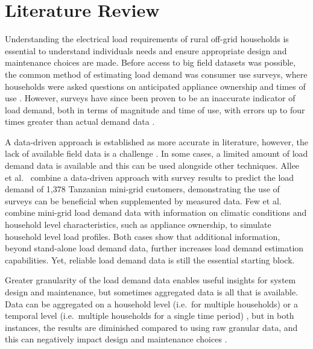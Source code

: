 \section{Literature Review}
Understanding the electrical load requirements of rural off-grid households is essential to understand individuals needs and ensure appropriate design and maintenance choices are made. Before access to big field datasets was possible, the common method of estimating load demand was consumer use surveys, where households were asked questions on anticipated appliance ownership and times of use \cite{Pandyaswargo2020EstimatingLaos, Sandwell2016AnalysisPradesh, Mandelli2016NovelAreas, Boait2017ESCoBox:World, Boait2015EstimationCountries}. However, surveys have since been proven to be an inaccurate indicator of load demand, both in terms of magnitude and time of use, with errors up to four times greater than actual demand data \cite{Blodgett2017AccuracyUserconsumption, Hartvigsson2018ComparisonData, Allee2021PredictingModels,Gelchu2023ComparisonEthiopia}. 

A data-driven approach is established as more accurate in literature, however, the lack of available field data is a challenge \cite{Bisaga2017ScalableSolar}. In some cases, a limited amount of load demand data is available and this can be used alongside other techniques. Allee et al.\ \cite{Allee2021PredictingModels} combine a data-driven approach with survey results to predict the load demand of 1,378 Tanzanian mini-grid customers, demonstrating the use of surveys can be beneficial when supplemented by measured data. Few et al.\ \cite{Few2022ElectricityDesign} combine mini-grid load demand data with information on climatic conditions and household level characteristics, such as appliance ownership, to simulate household level load profiles. Both cases show that additional information, beyond stand-alone load demand data, further increases load demand estimation capabilities. Yet, reliable load demand data is still the essential starting block.

Greater granularity of the load demand data enables useful insights for system design and maintenance, but sometimes aggregated data is all that is available. Data can be aggregated on a household level (i.e.\ for multiple households) \cite{Bhattacharyya2021AAsia} or a temporal level (i.e.\ multiple households for a single time period) \cite{DenHeeten2017UnderstandingElectrification}, but in both instances, the results are diminished compared to using raw granular data, and this can negatively impact design and maintenance choices \cite{Jurasz2022OnSystems}.

